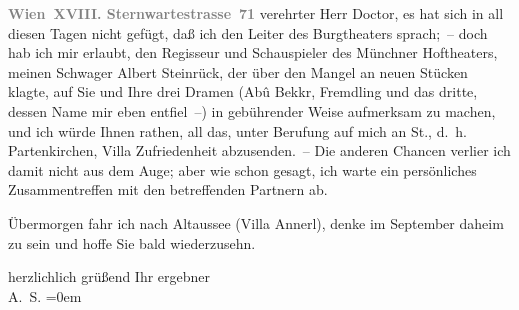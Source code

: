 \pstart
           \textcolor{gray}{\textbf{Wien XVIII. Sternwartestrasse 71}}\pend
           \vspace{0.5em}
\pstart
           verehrter Herr Doctor, es hat sich in all diesen Tagen nicht gefügt,
               daß ich den Leiter des Burgtheaters sprach; – doch hab ich mir erlaubt,
               den Regisseur und Schauspieler des Münchner
                  Hoftheaters, meinen Schwager Albert
                  Steinrück, der über den Mangel an neuen Stücken klagte, auf Sie und Ihre drei
               Dramen (Abû Bekkr, Fremdling und das dritte, dessen Name mir eben entfiel –) in gebührender
               Weise aufmerksam zu machen, {\pb}und ich würde Ihnen rathen,
               all das, unter Berufung auf mich an St., d. h.
                  Partenkirchen, Villa Zufriedenheit
               abzusenden. – Die anderen Chancen verlier ich damit nicht aus dem Auge; aber wie
               schon gesagt, ich warte ein persönliches Zusammentreffen mit den betreffenden
               Partnern ab.\pend
           
\pstart
           Übermorgen fahr ich nach Altaussee (Villa
                  Annerl), denke im September daheim zu sein und hoffe Sie bald
               wiederzusehn.\pend
           
\pstart
           herzlichlich grüßend Ihr ergebner{\\[\baselineskip]}\spacefill\mbox{A. S.}\pend
           \leftskip=0em{}\endnumbering{}  
      